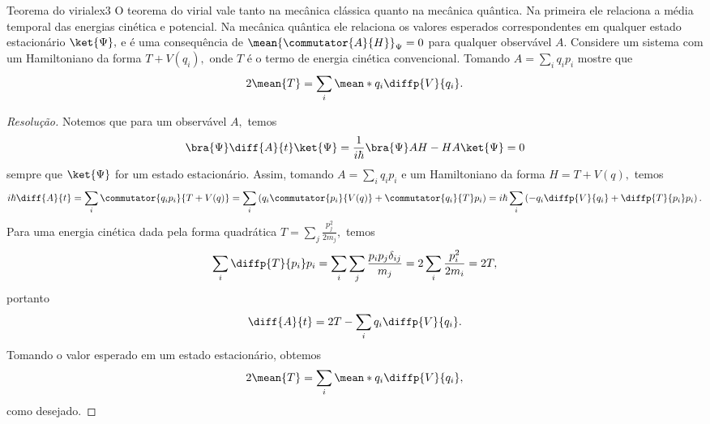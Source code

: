 \begin{exercício}{Teorema do virial}{ex3}
   O teorema do virial vale tanto na mecânica clássica quanto na mecânica quântica. Na primeira ele relaciona a média temporal das energias cinética e potencial. Na mecânica quântica ele relaciona os valores esperados correspondentes em qualquer estado estacionário \(\ket{\Psi},\) e é uma consequência de \(\mean{\commutator{A}{H}}_\Psi = 0\) para qualquer observável \(A.\) Considere um sistema com um Hamiltoniano da forma \(T + V(q_i),\) onde \(T\) é o termo de energia cinética convencional. Tomando \(A = \sum_i q_i p_i\) mostre que
   \begin{equation*}
      2 \mean{T} = \sum_i \mean*{q_i \diffp{V}{q_i}}.
   \end{equation*}
\end{exercício}
\begin{proof}[Resolução]
   Notemos que para um observável \(A,\) temos
   \begin{equation*}
      \bra{\Psi} \diff{A}{t}\ket{\Psi} = \frac{1}{i \hbar} \bra{\Psi} AH - HA \ket{\Psi} = 0
   \end{equation*}
   sempre que \(\ket{\Psi}\) for um estado estacionário. Assim, tomando \(A = \sum_{i} q_i p_i\) e um Hamiltoniano da forma \(H = T + V(q),\) temos
   \begin{equation*}
      i\hbar \diff{A}{t} = \sum_i \commutator{q_i p_i}{T + V(q)} = \sum_i \left(q_i \commutator{p_i}{V(q)} +  \commutator{q_i}{T} p_i\right) = i\hbar\sum_i \left(-q_i \diffp{V}{q_i} + \diffp{T}{p_i}p_i\right).
   \end{equation*}
   Para uma energia cinética dada pela forma quadrática \(T = \sum_j \frac{p_j^2}{2m_j},\) temos
   \begin{equation*}
      \sum_i \diffp{T}{p_i} p_i = \sum_i \sum_j \frac{p_i p_j \delta_{ij}}{m_j} = 2\sum_i \frac{p_i^2}{2m_i} = 2T,
   \end{equation*}
   portanto 
   \begin{equation*}
      \diff{A}{t} = 2T - \sum_{i} q_i \diffp{V}{q_i}.
   \end{equation*}
   Tomando o valor esperado em um estado estacionário, obtemos 
   \begin{equation*}
      2\mean{T} = \sum_i \mean*{q_i \diffp{V}{q_i}},
   \end{equation*}
   como desejado.
\end{proof}
